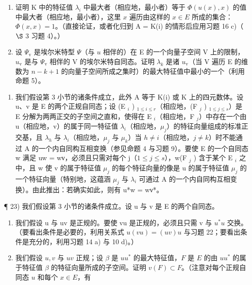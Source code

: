 \begin{enumerate}
\def\labelenumi{\alph{enumi})}
\item
  证明 K 中的特征值 \(\lambda_{i}\) 中最大者（相应地，最小者）等于 \(\Phi(u(x), x)\) 的值中最大者（相应地，最小者），这里 \(x\) 遍历由这样的 \(x \in E\) 所成的集合：\(\Phi(x, x) = 1\)。（直接论证，或者化归到 A = K(i) 的情形后应用习题 16 c)（ \(\S\) 3 习题 4）。）
\item
  设 \(\Psi_{\mathrm{v}}\) 是埃尔米特型 \(\Psi\)（与 \(u\) 相伴的）在 E 的一个向量子空间 V 上的限制，\(u_{\mathrm{v}}\) 是与 \(\Psi_{\mathrm{v}}\) 相伴的 V 的埃尔米特自同态。证明 \(\lambda_{k}\) 是诸 \(u_{\mathrm{v}}\)（当 V 遍历 E 的维数为 \(n - k + 1\) 的向量子空间所成之集时）的最大特征值中最小的一个（利用命题 5）。
\end{enumerate}

\begin{enumerate}
\def\labelenumi{\arabic{enumi})}
\setcounter{enumi}{21}
\tightlist
\item
  我们假设第 3 小节的诸条件成立，此外 A 等于 K(i) 或 K 上的四元数体。设 u、v 是 E 的两个正规自同态；设 (E \(_{i}\) ) \(_{1\leqslant i\leqslant r}\)（相应地，(F \(_{j}\) ) \(_{1\leqslant j\leqslant s}\)）是 E 分解为两两正交的子空间之直和，使得在 E \(_{i}\)（相应地，F \(_{j}\)）中存在一个由 u（相应地，v）的属于同一特征值 \(\lambda_{i}\)（相应地，\(\mu_{j}\)）的特征向量组成的标准正交基，且 \(\lambda_{h}\) 与 \(\lambda_{i}\)（相应地，\(\mu_{j}\) 与 \(\mu_{k}\)）当 \(h\neq i\)（相应地，\(j\neq k\)）时不能通过 A 的一个内自同构互相变换（参见命题 4 与习题 9）。要使 E 的一个自同态 w 满足 uw = wν，必须且只需对每个 j（\(1\leqslant j\leqslant s\)），w(F \(_{j}\) ) 含于某个 E \(_{i}\) 之中，且 w 使 v 的属于特征值 \(\mu_{j}\) 的每个特征向量的像是 u 的属于特征值 \(\mu_{j}\) 的一个特征向量（特别地，这蕴涵 \(\mu_{j}\) 与 \(\lambda_{i}\) 可通过 A 的一个内自同构互相变换）。由此推出：若确实如此，则有 u*w = wν*。
\end{enumerate}

¶ 23) 我们假设第 3 小节的诸条件成立。设 u 与 v 是 E 的两个自同态。

\begin{enumerate}
\def\labelenumi{\alph{enumi})}
\item
  我们假设 u 与 uv 是正规的。要使 vu 是正规的，必须且只需 v 与 \(u^{*}u\) 交换。（要看出条件是必要的，利用关系式 \(u(vu) = (uv)u\) 与习题 22；要看出条件是充分的，利用习题 14 a) 与 10 d)。）
\item
  我们假设 \(u, v\) 与 \(uv\) 正规；设 \(\beta\) 是 \(uu^*\) 的最大特征值，\(F\) 是 \(E\) 的由 \(uu^*\) 的属于特征值 \(\beta\) 的特征向量所成的子空间。证明 \(v(F) \subset F\)。（注意对每个正规自同态 \(u\) 和每个 \(x \in E\)，有
\end{enumerate}

